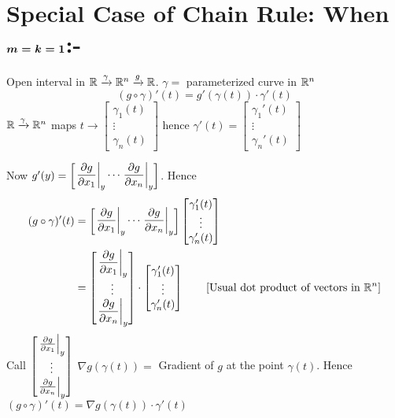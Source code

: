 \section{Special Case of Chain Rule: When $\boldsymbol{m=k=1}$:-}
Open interval in $\mathbb{R}\xrightarrow{\gamma}\mathbb{R}^n\xrightarrow{g}\mathbb{R}$. $\gamma=$ parameterized curve in $\mathbb{R}^n$
$$(g\circ \gamma)'(t)=g'(\gamma(t))\cdot \gamma'(t)$$ ${\mathbb{R}\xrightarrow{\gamma}\mathbb{R}^n}$ maps $t\to\begin{bmatrix}\gamma_1(t)\\ \vdots\\ \gamma_n(t)	\end{bmatrix}$ hence $\gamma'(t)=\begin{bmatrix}
	\gamma_1'(t)\\ \vdots\\ \gamma_n'(t)
\end{bmatrix}$

Now $g'(y)=\begin{bmatrix}
	\left.\dfrac{\partial g}{\partial x_1}\right|_y\cdots \left.\dfrac{\partial g}{\partial x_n}\right|_y
\end{bmatrix}$. Hence \begin{align*}
(g\circ \gamma)'(t) & = \begin{bmatrix}
	\left.\dfrac{\partial g}{\partial x_1}\right|_y\cdots \left.\dfrac{\partial g}{\partial x_n}\right|_y
\end{bmatrix}\begin{bmatrix}
\gamma_1'(t)\\ \vdots\\ \gamma_n'(t)
\end{bmatrix}\\
& = \begin{bmatrix}
	\left.\dfrac{\partial g}{\partial x_1}\right|_y \\ \vdots \\ \left.\dfrac{\partial g}{\partial x_n}\right|_y
\end{bmatrix}\cdot \begin{bmatrix}
	\gamma_1'(t)\\ \vdots\\ \gamma_n'(t)
\end{bmatrix}\qquad[\text{Usual dot product of vectors in }\mathbb{R}^n] \\
\end{align*}Call $\begin{bmatrix}
\left.\frac{\partial g}{\partial x_1}\right|_y \\ \vdots \\ \left.\frac{\partial g}{\partial x_n}\right|_y
\end{bmatrix}$ $\nabla g(\gamma(t))=$ Gradient of $g$ at the point $\gamma(t)$. Hence $(g\circ\gamma)'(t)=\nabla g(\gamma(t))\cdot\gamma'(t)$


